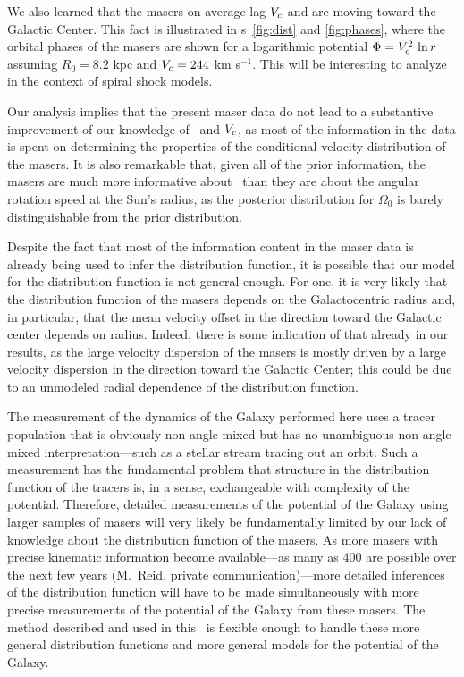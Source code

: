 We also learned that the masers on average lag $V_c$ and are moving
toward the Galactic Center. This fact is illustrated in \figurename
s~\ref{fig:dist} and \ref{fig:phases}, where the orbital phases of the
masers are shown for a logarithmic potential $\Phi = V_c^2 \,\ln r$
\citep[\eg, \eqnname~(3.14) in][]{2008gady.book.....B} assuming $R_0 =
8.2$ kpc and $V_c = 244$ km s$^{-1}$. This will be interesting to
analyze in the context of spiral shock models.

Our analysis implies that the present maser data do not lead to a
substantive improvement of our knowledge of \Ro\ and $V_c$, as most of
the information in the data is spent on determining the properties of
the conditional velocity distribution of the masers. It is also
remarkable that, given all of the prior information, the masers are
much more informative about \Ro\ than they are about the angular
rotation speed at the Sun's radius, as the posterior distribution for
$\Omega_0$ is barely distinguishable from the prior distribution.

Despite the fact that most of the information content in the maser
data is already being used to infer the distribution function, it is
possible that our model for the distribution function is not general
enough. For one, it is very likely that the distribution function of
the masers depends on the Galactocentric radius and, in particular,
that the mean velocity offset in the direction toward the Galactic
center depends on radius. Indeed, there is some indication of that
already in our results, as the large velocity dispersion of the masers
is mostly driven by a large velocity dispersion in the direction
toward the Galactic Center; this could be due to an unmodeled radial
dependence of the distribution function.

The measurement of the dynamics of the Galaxy performed here uses a
tracer population that is obviously non-angle mixed but has no
unambiguous non-angle-mixed interpretation---such as a stellar stream
tracing out an orbit. Such a measurement has the fundamental problem
that structure in the distribution function of the tracers is, in a
sense, exchangeable with complexity of the potential. Therefore,
detailed measurements of the potential of the Galaxy using larger
samples of masers will very likely be fundamentally limited by our
lack of knowledge about the distribution function of the masers. As
more masers with precise kinematic information become available---as
many as 400 are possible over the next few years (M.~Reid, private
communication)---more detailed inferences of the distribution function
will have to be made simultaneously with more precise measurements of
the potential of the Galaxy from these masers. The method described
and used in this \chaptername\ is flexible enough to handle these more
general distribution functions and more general models for the
potential of the Galaxy.


